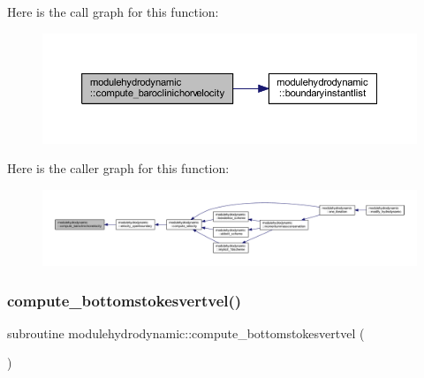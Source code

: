 Here is the call graph for this function\+:\nopagebreak
\begin{figure}[H]
\begin{center}
\leavevmode
\includegraphics[width=350pt]{namespacemodulehydrodynamic_a5548f1e73131ae2e60c1386848706e83_cgraph}
\end{center}
\end{figure}
Here is the caller graph for this function\+:\nopagebreak
\begin{figure}[H]
\begin{center}
\leavevmode
\includegraphics[width=350pt]{namespacemodulehydrodynamic_a5548f1e73131ae2e60c1386848706e83_icgraph}
\end{center}
\end{figure}
\mbox{\label{namespacemodulehydrodynamic_a7cd2ef8de29d245b1298263b1facaaea}} 
\subsubsection{\texorpdfstring{compute\+\_\+bottomstokesvertvel()}{compute\_bottomstokesvertvel()}}
{\footnotesize\ttfamily subroutine modulehydrodynamic\+::compute\+\_\+bottomstokesvertvel (\begin{DoxyParamCaption}{ }\end{DoxyParamCaption})\hspace{0.3cm}{\ttfamily [private]}}

